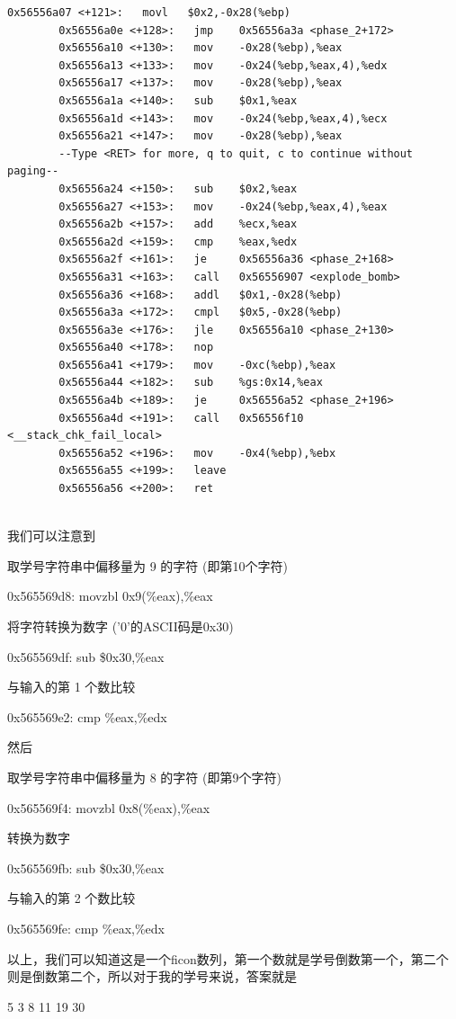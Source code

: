 \documentclass[supercite]{Experimental_Report}
\theoremstyle{definition}
\begin{document}
\begin{lstlisting}[style=commonCodeStyle, caption={phase2}, label={lst:3-1}]
		0x56556a07 <+121>:   movl   $0x2,-0x28(%ebp)
		0x56556a0e <+128>:   jmp    0x56556a3a <phase_2+172>
		0x56556a10 <+130>:   mov    -0x28(%ebp),%eax
		0x56556a13 <+133>:   mov    -0x24(%ebp,%eax,4),%edx
		0x56556a17 <+137>:   mov    -0x28(%ebp),%eax
		0x56556a1a <+140>:   sub    $0x1,%eax
		0x56556a1d <+143>:   mov    -0x24(%ebp,%eax,4),%ecx
		0x56556a21 <+147>:   mov    -0x28(%ebp),%eax
		--Type <RET> for more, q to quit, c to continue without paging--
		0x56556a24 <+150>:   sub    $0x2,%eax
		0x56556a27 <+153>:   mov    -0x24(%ebp,%eax,4),%eax
		0x56556a2b <+157>:   add    %ecx,%eax
		0x56556a2d <+159>:   cmp    %eax,%edx
		0x56556a2f <+161>:   je     0x56556a36 <phase_2+168>
		0x56556a31 <+163>:   call   0x56556907 <explode_bomb>
		0x56556a36 <+168>:   addl   $0x1,-0x28(%ebp)
		0x56556a3a <+172>:   cmpl   $0x5,-0x28(%ebp)
		0x56556a3e <+176>:   jle    0x56556a10 <phase_2+130>
		0x56556a40 <+178>:   nop
		0x56556a41 <+179>:   mov    -0xc(%ebp),%eax
		0x56556a44 <+182>:   sub    %gs:0x14,%eax
		0x56556a4b <+189>:   je     0x56556a52 <phase_2+196>
		0x56556a4d <+191>:   call   0x56556f10 <__stack_chk_fail_local>
		0x56556a52 <+196>:   mov    -0x4(%ebp),%ebx
		0x56556a55 <+199>:   leave
		0x56556a56 <+200>:   ret
		
	\end{lstlisting}
	
	我们可以注意到
	
	取学号字符串中偏移量为 9 的字符 (即第10个字符)
	
	0x565569d8: movzbl 0x9(\%eax),\%eax  
	
	将字符转换为数字 ('0'的ASCII码是0x30)
	
	0x565569df: sub    \$0x30,\%eax      
	
	与输入的第 1 个数比较
	
	0x565569e2: cmp    \%eax,\%edx       
	
	然后
	
	取学号字符串中偏移量为 8 的字符 (即第9个字符)
	
	0x565569f4: movzbl 0x8(\%eax),\%eax  
	
	转换为数字
	
	0x565569fb: sub    \$0x30,\%eax      
	
	与输入的第 2 个数比较
	
	0x565569fe: cmp    \%eax,\%edx       
	
	以上，我们可以知道这是一个ficon数列，第一个数就是学号倒数第一个，第二个则是倒数第二个，所以对于我的学号来说，答案就是
	
	5 3 8 11 19 30
	
\end{document}
